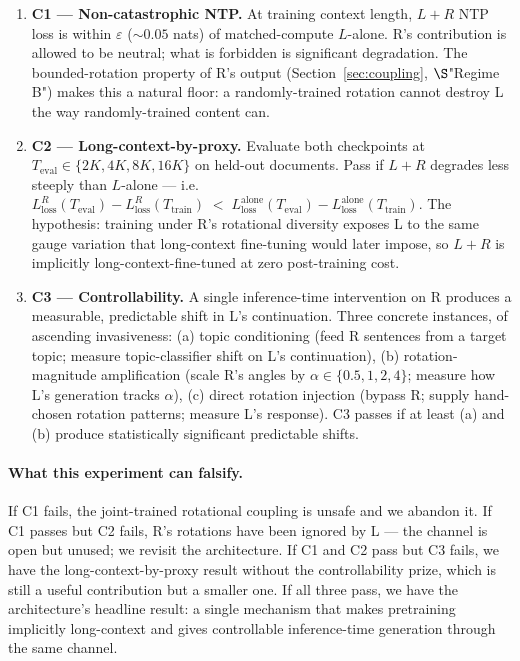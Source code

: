 \documentclass[10pt, twocolumn, a4paper]{article}
\begin{document}
\begin{enumerate}[nosep,leftmargin=1.5em]
\item \textbf{C1 --- Non-catastrophic NTP.} At training context length, $L+R$ NTP loss is within $\varepsilon$ ($\sim 0.05$ nats) of matched-compute $L$-alone. R's contribution is allowed to be neutral; what is forbidden is significant degradation. The bounded-rotation property of R's output (Section~\ref{sec:coupling}, $\S$"Regime B") makes this a natural floor: a randomly-trained rotation cannot destroy L the way randomly-trained content can.
\item \textbf{C2 --- Long-context-by-proxy.} Evaluate both checkpoints at $T_{\text{eval}} \in \{2K, 4K, 8K, 16K\}$ on held-out documents. Pass if $L+R$ degrades less steeply than $L$-alone --- i.e.\ $L_{\text{loss}}^R(T_{\text{eval}}) - L_{\text{loss}}^R(T_{\text{train}}) \;<\; L_{\text{loss}}^{\text{alone}}(T_{\text{eval}}) - L_{\text{loss}}^{\text{alone}}(T_{\text{train}})$. The hypothesis: training under R's rotational diversity exposes L to the same gauge variation that long-context fine-tuning would later impose, so $L+R$ is implicitly long-context-fine-tuned at zero post-training cost.
\item \textbf{C3 --- Controllability.} A single inference-time intervention on R produces a measurable, predictable shift in L's continuation. Three concrete instances, of ascending invasiveness: (a) topic conditioning (feed R sentences from a target topic; measure topic-classifier shift on L's continuation), (b) rotation-magnitude amplification (scale R's angles by $\alpha \in \{0.5, 1, 2, 4\}$; measure how L's generation tracks $\alpha$), (c) direct rotation injection (bypass R; supply hand-chosen rotation patterns; measure L's response). C3 passes if at least (a) and (b) produce statistically significant predictable shifts.
\end{enumerate}

\paragraph{What this experiment can falsify.} If C1 fails, the joint-trained rotational coupling is unsafe and we abandon it. If C1 passes but C2 fails, R's rotations have been ignored by L --- the channel is open but unused; we revisit the architecture. If C1 and C2 pass but C3 fails, we have the long-context-by-proxy result without the controllability prize, which is still a useful contribution but a smaller one. If all three pass, we have the architecture's headline result: a single mechanism that makes pretraining implicitly long-context and gives controllable inference-time generation through the same channel.
\end{document}
